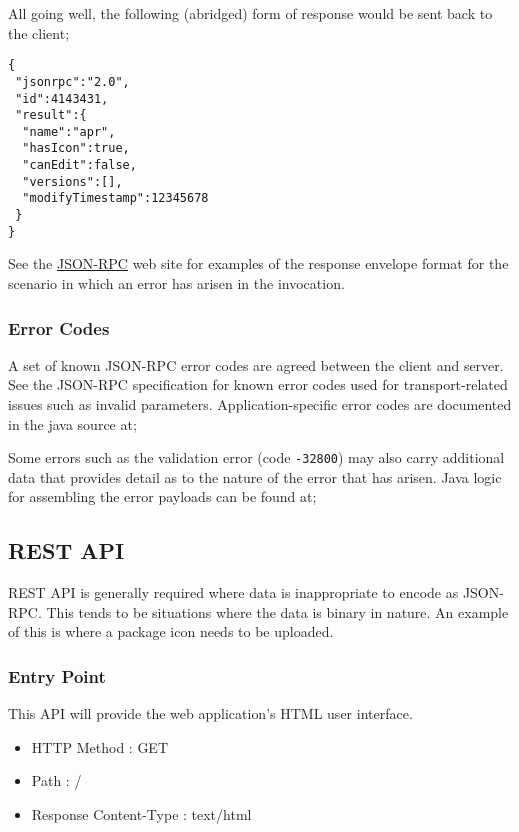 All going well, the following (abridged) form of response would be sent back to the client;

\begin{verbatim}
{
 "jsonrpc":"2.0",
 "id":4143431,
 "result":{
  "name":"apr",
  "hasIcon":true,
  "canEdit":false,
  "versions":[],
  "modifyTimestamp":12345678
 }
}
\end{verbatim}

See the \href{http://www.jsonrpc.org}{JSON-RPC} web site for examples of the response envelope format for the scenario in which an error has arisen in the invocation.

\subsubsection{Error Codes}

A set of known JSON-RPC error codes are agreed between the client and server.  See the JSON-RPC specification for known error codes used for transport-related issues such as invalid parameters.  Application-specific error codes are documented in the java source at;


Some errors such as the validation error (code {\tt -32800}) may also carry additional data that provides detail as to the nature of the error that has arisen.  Java logic for assembling the error payloads can be found at;


\subsection{REST API}

REST API is generally required where data is inappropriate to encode as JSON-RPC.  This tends to be situations where the data is binary in nature.  An example of this is where a package icon needs to be uploaded.

\subsubsection{Entry Point}

This API will provide the web application's HTML user interface.

\begin{itemize}
\item HTTP Method : GET
\item Path : /
\item Response Content-Type : text/html
\end{itemize}

